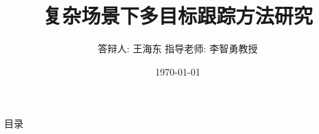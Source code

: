 \documentclass[UTF8,10pt,aspectratio=43,mathserif,table]{beamer}
\title{复杂场景下多目标跟踪方法研究}
\author{\newline \newline \newline \newline \newline 答辩人: 王海东  \newline  指导老师: 李智勇教授}
\institute{\fontsize{8pt}{14pt}湖南大学信息科学与工程学院}
\date{\today}
\begin{document}

\frame{\titlepage}

\section[目录]{}   %
\begin{frame}{目录}
\tableofcontents
\end{frame}
















\end{document}
